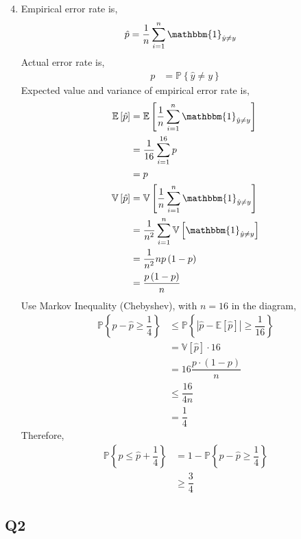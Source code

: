 \documentclass{article}
\begin{document}
\begin{enumerate}
\setcounter{enumii}{3}
\item Empirical error rate is,
\begin{align*}
\hat{p} &= \dfrac{1}{n} \displaystyle\sum_{i=1}^{n} \mathbbm{1}_{\hat{y} \neq  y}
\end{align*}
Actual error rate is,
\begin{align*}
p  &= \mathbb{P}\left\{\hat{y} \neq  y\right\}
\end{align*}
Expected value and variance of empirical error rate is,
\begin{align*}
\mathbb{E}\left[\hat{p}\right] &= \mathbb{E}\left[\dfrac{1}{n} \displaystyle\sum_{i=1}^{n} \mathbbm{1}_{\hat{y} \neq  y}\right]
\\ &= \dfrac{1}{16} \displaystyle\sum_{i=1}^{16} p 
\\ &= p 
\\ \mathbb{V}\left[\hat{p}\right] &= \mathbb{V}\left[\dfrac{1}{n} \displaystyle\sum_{i=1}^{n} \mathbbm{1}_{\hat{y} \neq  y}\right]
\\ &= \dfrac{1}{n^{2}} \displaystyle\sum_{i=1}^{n} \mathbb{V}\left[\mathbbm{1}_{\hat{y} \neq  y}\right]
\\ &= \dfrac{1}{n^{2}} n p \left(1 - p \right)
\\ &= \dfrac{p \left(1 - p\right)}{n}
\end{align*}
Use Markov Inequality (Chebyshev), with $n  = 16$ in the diagram,
\begin{align*}
\mathbb{P}\left\{p - \hat{p} \geq  \dfrac{1}{4}\right\} &\leq  \mathbb{P}\left\{| \hat{p} - \mathbb{E}\left[\hat{p}\right] | \geq  \dfrac{1}{16}\right\}
\\ &= \mathbb{V}\left[\hat{p}\right] \cdot  16
\\ &= 16 \dfrac{p \cdot  \left(1 - p\right)}{n}
\\ &\leq  \dfrac{16}{4 n}
\\ &= \dfrac{1}{4}
\end{align*}
Therefore,
\begin{align*}
\mathbb{P}\left\{p \leq  \hat{p} + \dfrac{1}{4}\right\} &= 1 - \mathbb{P}\left\{p - \hat{p} \geq  \dfrac{1}{4}\right\}
\\ &\geq  \dfrac{3}{4}
\end{align*}
\end{enumerate}


\subsection{Q2}
\end{document}
